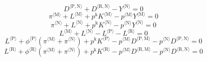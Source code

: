 \begin{equation}
{D}^{\langle \mathrm{P},\mathrm{N}\rangle} + {D}^{\langle \mathrm{R},\mathrm{N}\rangle} - {Y}^{\langle \mathrm{N}\rangle} = 0
\end{equation}
\begin{equation}
{\pi}^{\langle \mathrm{M}\rangle} + {L}^{\langle \mathrm{M}\rangle} + {p^{\mathrm{k}}} {{K}^{\langle \mathrm{M}\rangle}} - {{p}^{\langle \mathrm{M}\rangle}} {{Y}^{\langle \mathrm{M}\rangle}} = 0
\end{equation}
\begin{equation}
{\pi}^{\langle \mathrm{N}\rangle} + {L}^{\langle \mathrm{N}\rangle} + {p^{\mathrm{k}}} {{K}^{\langle \mathrm{N}\rangle}} - {{p}^{\langle \mathrm{N}\rangle}} {{Y}^{\langle \mathrm{N}\rangle}} = 0
\end{equation}
\begin{equation}
{L}^{\langle \mathrm{M}\rangle} + {L}^{\langle \mathrm{N}\rangle} - {L}^{\langle \mathrm{P}\rangle} - {L}^{\langle \mathrm{R}\rangle} = 0
\end{equation}
\begin{equation}
{L}^{\langle \mathrm{P}\rangle} + {{\phi}^{\langle \mathrm{\mathrm{P}}\rangle}} \left({\pi}^{\langle \mathrm{M}\rangle} + {\pi}^{\langle \mathrm{N}\rangle}\right) + {p^{\mathrm{k}}} {{K}^{\langle \mathrm{P}\rangle}} - {{p}^{\langle \mathrm{M}\rangle}} {{D}^{\langle \mathrm{P},\mathrm{M}\rangle}} - {{p}^{\langle \mathrm{N}\rangle}} {{D}^{\langle \mathrm{P},\mathrm{N}\rangle}} = 0
\end{equation}
\begin{equation}
{L}^{\langle \mathrm{R}\rangle} + {{\phi}^{\langle \mathrm{\mathrm{R}}\rangle}} \left({\pi}^{\langle \mathrm{M}\rangle} + {\pi}^{\langle \mathrm{N}\rangle}\right) + {p^{\mathrm{k}}} {{K}^{\langle \mathrm{R}\rangle}} - {{p}^{\langle \mathrm{M}\rangle}} {{D}^{\langle \mathrm{R},\mathrm{M}\rangle}} - {{p}^{\langle \mathrm{N}\rangle}} {{D}^{\langle \mathrm{R},\mathrm{N}\rangle}} = 0
\end{equation}








